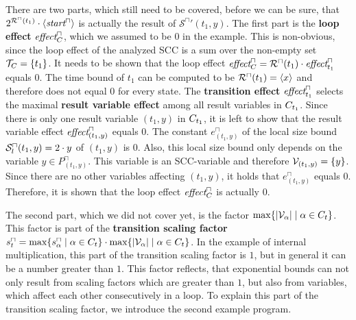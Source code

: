 There are two parts, which still need to be covered, before we can be sure, that $2^{{\mathcal{R}^\sqcap}(t_1)} \cdot \langle\emph{start}^\sqcap\rangle$ is actually the result of ${\mathcal{S}^\sqcap}'(t_1,y)$.
The first part is the \textbf{loop effect} $\emph{effect}^\sqcap_C$, which we assumed to be $0$ in the example.
This is non-obvious, since the loop effect of the analyzed SCC is a sum over the non-empty set $\mathcal{T}_C = \lbrace t_1 \rbrace$.
It needs to be shown that the loop effect $\emph{effect}^\sqcap_C = {\mathcal{R}^\sqcap}(t_1) \cdot \emph{effect}^\sqcap_{t_1}$ equals $0$.
The time bound of $t_1$ can be computed to be ${\mathcal{R}^\sqcap}(t_1) = \langle x\rangle$ and therefore does not equal $0$ for every state.
The \textbf{transition effect} $\emph{effect}^\sqcap_{t_1}$ selects the maximal \textbf{result variable effect} among all result variables in $C_{t_1}$.
Since there is only one result variable $(t_1,y)$ in $C_{t_1}$, it is left to show that the result variable effect $\emph{effect}^\sqcap_{(t_1,y)}$ equals $0$.
The constant $e^\sqcap_{(t_1,y)}$ of the local size bound ${\mathcal{S}^\sqcap_l}(t_1,y) = 2 \cdot y$ of $(t_1,y)$ is $0$.
Also, this local size bound only depends on the variable $y \in P^\sqcap_{(t_1,y)}$.
This variable is an SCC-variable and therefore $\mathcal{V}_{(t_1,y)} = \lbrace y \rbrace$.
Since there are no other variables affecting $(t_1,y)$, it holds that $e^\sqcap_{(t_1,y)}$ equals $0$.
Therefore, it is shown that the loop effect $\emph{effect}^\sqcap_C$ is actually $0$.

The second part, which we did not cover yet, is the factor $\max \lbrace \left|\mathcal{V}_\alpha\right| \mid \alpha \in C_t \rbrace$.
This factor is part of the \textbf{transition scaling factor} $s^\sqcap_t = \max \lbrace s^\sqcap_\alpha \mid \alpha \in C_t \rbrace \cdot \max \lbrace \left|\mathcal{V}_\alpha\right| \mid \alpha \in C_t \rbrace$.
In the example of internal multiplication, this part of the transition scaling factor is $1$, but in general it can be a number greater than $1$.
This factor reflects, that exponential bounds can not only result from scaling factors which are greater than $1$, but also from variables, which affect each other consecutively in a loop.
To explain this part of the transition scaling factor, we introduce the second example program.

